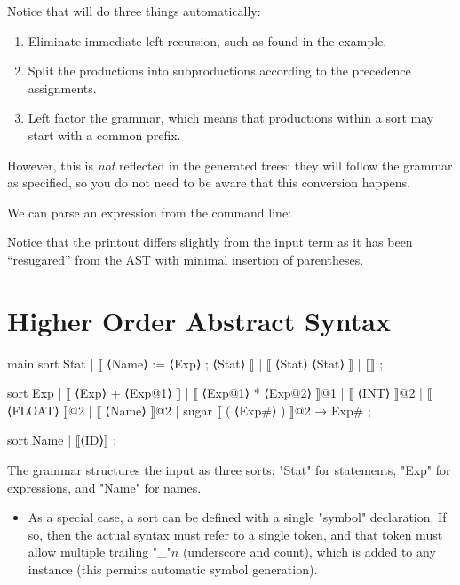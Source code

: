 \documentclass[11pt]{article} %
\begin{document}
Notice that \HAX will do three things automatically:
\begin{enumerate}
\item Eliminate immediate left recursion, such as found in the example.
\item Split the productions into subproductions according to the precedence assignments.
\item Left factor the grammar, which means that productions within a sort may start with a common
  prefix.
\end{enumerate}
However, this is \emph{not} reflected in the generated trees: they will follow the grammar as
specified, so you do not need to be aware that this conversion happens.

\begin{commands}
  We can parse an expression from the command line:
  Notice that the printout differs slightly from the input term as it has been ``resugared'' from
  the AST with minimal insertion of parentheses.
\end{commands}


\section{Higher Order Abstract Syntax}
\label{sec:hoas}


\begin{example}\label{ex:hoas}

\begin{hacs}[xleftmargin=\parindent,xrightmargin=2em,numbers=right]
main sort Stat  | ⟦ ⟨Name⟩ := ⟨Exp⟩ ; ⟨Stat⟩ ⟧
                | ⟦ { ⟨Stat⟩ } ⟨Stat⟩ ⟧
                | ⟦⟧ ;

sort Exp  | ⟦ ⟨Exp⟩ + ⟨Exp@1⟩ ⟧
          | ⟦ ⟨Exp@1⟩ * ⟨Exp@2⟩ ⟧@1
          | ⟦ ⟨INT⟩ ⟧@2
          | ⟦ ⟨FLOAT⟩ ⟧@2
          | ⟦ ⟨Name⟩ ⟧@2
          | sugar ⟦ ( ⟨Exp#⟩ ) ⟧@2 → Exp# ;

sort Name  | ⟦⟨ID⟩⟧ ;
\end{hacs}
  The grammar structures the input as three sorts: "Stat" for statements, "Exp" for expressions, and
  "Name" for names.
\end{example}



\begin{itemize}

\item As a special case, a sort can be defined with a single "symbol" declaration. If so, then the
  actual syntax must refer to a single token, and that token must allow multiple trailing "_"$n$
  (underscore and count), which is added to any instance (this permits automatic symbol generation).

\end{itemize}
\end{document}

